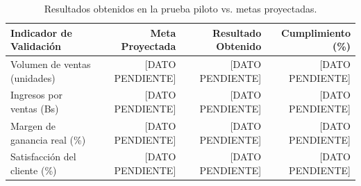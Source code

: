 \begin{table}[htbp]
    \centering
    \caption{Resultados obtenidos en la prueba piloto vs. metas proyectadas.}
    \label{tab:resultados_piloto}
    \begin{tabularx}{\textwidth}{Xrrr}
        \toprule
        \textbf{Indicador de Validación} & \textbf{Meta Proyectada} & \textbf{Resultado Obtenido} & \textbf{Cumplimiento (\%)} \\
        \midrule
        Volumen de ventas (unidades)    & [DATO PENDIENTE] & [DATO PENDIENTE] & [DATO PENDIENTE] \\
        Ingresos por ventas (Bs)        & [DATO PENDIENTE] & [DATO PENDIENTE] & [DATO PENDIENTE] \\
        Margen de ganancia real (\%)    & [DATO PENDIENTE] & [DATO PENDIENTE] & [DATO PENDIENTE] \\
        Satisfacción del cliente (\%)   & [DATO PENDIENTE] & [DATO PENDIENTE] & [DATO PENDIENTE] \\
        \bottomrule
    \end{tabularx}
\end{table}

